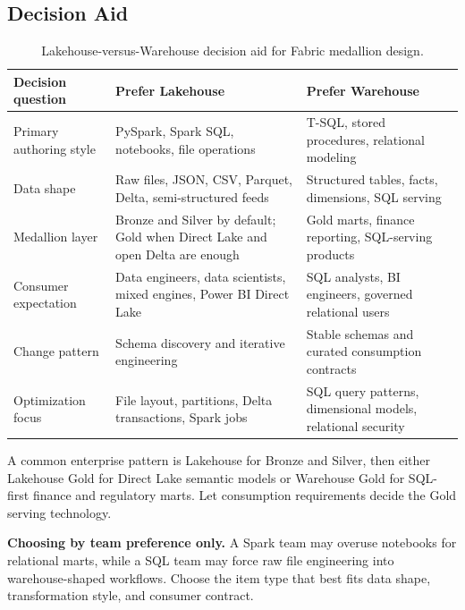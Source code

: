 \subsection{Decision Aid}
\begin{table}[H]
\centering
\small
\begin{tabular}{@{}p{4.0cm}p{4.6cm}p{4.6cm}@{}}
\toprule
\textbf{Decision question} & \textbf{Prefer Lakehouse} & \textbf{Prefer Warehouse} \\
\midrule
Primary authoring style & PySpark, Spark SQL, notebooks, file operations & T-SQL, stored procedures, relational modeling \\
Data shape & Raw files, JSON, CSV, Parquet, Delta, semi-structured feeds & Structured tables, facts, dimensions, SQL serving \\
Medallion layer & Bronze and Silver by default; Gold when Direct Lake and open Delta are enough & Gold marts, finance reporting, SQL-serving products \\
Consumer expectation & Data engineers, data scientists, mixed engines, Power BI Direct Lake & SQL analysts, BI engineers, governed relational users \\
Change pattern & Schema discovery and iterative engineering & Stable schemas and curated consumption contracts \\
Optimization focus & File layout, partitions, Delta transactions, Spark jobs & SQL query patterns, dimensional models, relational security \\
\bottomrule
\end{tabular}
\caption{Lakehouse-versus-Warehouse decision aid for Fabric medallion design.}
\label{tab:chapter2-lakehouse-warehouse-decision}
\end{table}

\begin{tipbox}
A common enterprise pattern is Lakehouse for Bronze and Silver, then either Lakehouse Gold for Direct Lake semantic models or Warehouse Gold for SQL-first finance and regulatory marts. Let consumption requirements decide the Gold serving technology.
\end{tipbox}

\begin{pitfall}
\textbf{Choosing by team preference only.} A Spark team may overuse notebooks for relational marts, while a SQL team may force raw file engineering into warehouse-shaped workflows. Choose the item type that best fits data shape, transformation style, and consumer contract.
\end{pitfall}


